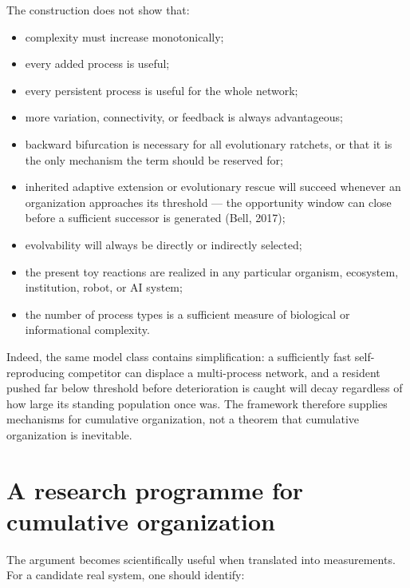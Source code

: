 \documentclass[11pt]{article}
\providecommand{\tightlist}{\setlength{\itemsep}{0pt}\setlength{\parskip}{0pt}}
\begin{document}
The construction does not show that:

\begin{itemize}
\tightlist
\item
  complexity must increase monotonically;
\item
  every added process is useful;
\item
  every persistent process is useful for the whole network;
\item
  more variation, connectivity, or feedback is always advantageous;
\item
  backward bifurcation is necessary for all evolutionary ratchets, or
  that it is the only mechanism the term should be reserved for;
\item
  inherited adaptive extension or evolutionary rescue will succeed
  whenever an organization approaches its threshold --- the opportunity
  window can close before a sufficient successor is generated (Bell,
  2017);
\item
  evolvability will always be directly or indirectly selected;
\item
  the present toy reactions are realized in any particular organism,
  ecosystem, institution, robot, or AI system;
\item
  the number of process types is a sufficient measure of biological or
  informational complexity.
\end{itemize}

Indeed, the same model class contains simplification: a sufficiently
fast self-reproducing competitor can displace a multi-process network,
and a resident pushed far below threshold before deterioration is caught
will decay regardless of how large its standing population once was. The
framework therefore supplies mechanisms for cumulative organization, not
a theorem that cumulative organization is inevitable.

\section{A research programme for cumulative
organization}
The argument becomes scientifically useful when translated into
measurements. For a candidate real system, one should identify:
\end{document}
